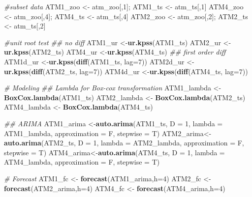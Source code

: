 \documentclass[openany]{book}
\newenvironment{Shaded}{\begin{snugshade}}{\end{snugshade}}
\newcommand{\CommentTok}[1]{\textcolor[rgb]{0.56,0.35,0.01}{\textit{#1}}}
\newcommand{\DataTypeTok}[1]{\textcolor[rgb]{0.13,0.29,0.53}{#1}}
\newcommand{\DecValTok}[1]{\textcolor[rgb]{0.00,0.00,0.81}{#1}}
\newcommand{\KeywordTok}[1]{\textcolor[rgb]{0.13,0.29,0.53}{\textbf{#1}}}
\newcommand{\NormalTok}[1]{#1}
\newcommand{\StringTok}[1]{\textcolor[rgb]{0.31,0.60,0.02}{#1}}
\begin{document}
\begin{Shaded}
\begin{Highlighting}[]
{{{{{{{{\CommentTok{#subset data }
\NormalTok{ATM1_zoo <-}\StringTok{ }\NormalTok{atm_zoo[,}\DecValTok{1}\NormalTok{]; ATM1_ts <-}\StringTok{ }\NormalTok{atm_ts[,}\DecValTok{1}\NormalTok{]}
\NormalTok{ATM4_zoo <-}\StringTok{ }\NormalTok{atm_zoo[,}\DecValTok{4}\NormalTok{]; ATM4_ts <-}\StringTok{ }\NormalTok{atm_ts[,}\DecValTok{4}\NormalTok{]}
\NormalTok{ATM2_zoo <-}\StringTok{ }\NormalTok{atm_zoo[,}\DecValTok{2}\NormalTok{]; ATM2_ts <-}\StringTok{ }\NormalTok{atm_ts[,}\DecValTok{2}\NormalTok{]}

\CommentTok{#unit root test}
\CommentTok{## no diff}
\NormalTok{ATM1_ur <-}\KeywordTok{ur.kpss}\NormalTok{(ATM1_ts)}
\NormalTok{ATM2_ur <-}\KeywordTok{ur.kpss}\NormalTok{(ATM2_ts)}
\NormalTok{ATM4_ur <-}\KeywordTok{ur.kpss}\NormalTok{(ATM4_ts)}
\CommentTok{## first order diff}
\NormalTok{ATM1d_ur <-}\KeywordTok{ur.kpss}\NormalTok{(}\KeywordTok{diff}\NormalTok{(ATM1_ts, }\DataTypeTok{lag=}\DecValTok{7}\NormalTok{))}
\NormalTok{ATM2d_ur <-}\KeywordTok{ur.kpss}\NormalTok{(}\KeywordTok{diff}\NormalTok{(ATM2_ts, }\DataTypeTok{lag=}\DecValTok{7}\NormalTok{))}
\NormalTok{ATM4d_ur <-}\KeywordTok{ur.kpss}\NormalTok{(}\KeywordTok{diff}\NormalTok{(ATM4_ts, }\DataTypeTok{lag=}\DecValTok{7}\NormalTok{))}

\CommentTok{# Modeling }
\CommentTok{## Lambda for Box-cox transformation}
\NormalTok{ATM1_lambda <-}\StringTok{ }\KeywordTok{BoxCox.lambda}\NormalTok{(ATM1_ts)}
\NormalTok{ATM2_lambda <-}\StringTok{ }\KeywordTok{BoxCox.lambda}\NormalTok{(ATM2_ts)}
\NormalTok{ATM4_lambda <-}\StringTok{ }\KeywordTok{BoxCox.lambda}\NormalTok{(ATM4_ts)}

\CommentTok{## ARIMA}
\NormalTok{ATM1_arima <-}\KeywordTok{auto.arima}\NormalTok{(ATM1_ts, }\DataTypeTok{D =} \DecValTok{1}\NormalTok{, }\DataTypeTok{lambda =}\NormalTok{ ATM1_lambda, }\DataTypeTok{approximation =}\NormalTok{ F, }\DataTypeTok{stepwise =}\NormalTok{ T)}
\NormalTok{ATM2_arima<-}\KeywordTok{auto.arima}\NormalTok{(ATM2_ts, }\DataTypeTok{D =} \DecValTok{1}\NormalTok{, }\DataTypeTok{lambda =}\NormalTok{ ATM2_lambda, }\DataTypeTok{approximation =}\NormalTok{ F, }\DataTypeTok{stepwise =}\NormalTok{ T)}
\NormalTok{ATM4_arima<-}\KeywordTok{auto.arima}\NormalTok{(ATM4_ts, }\DataTypeTok{D =} \DecValTok{1}\NormalTok{, }\DataTypeTok{lambda =}\NormalTok{ ATM4_lambda, }\DataTypeTok{approximation =}\NormalTok{ F, }\DataTypeTok{stepwise =}\NormalTok{ T)}

\CommentTok{# Forecast}
\NormalTok{ATM1_fc <-}\StringTok{ }\KeywordTok{forecast}\NormalTok{(ATM1_arima,}\DataTypeTok{h=}\DecValTok{4}\NormalTok{)}
\NormalTok{ATM2_fc <-}\StringTok{ }\KeywordTok{forecast}\NormalTok{(ATM2_arima,}\DataTypeTok{h=}\DecValTok{4}\NormalTok{)}
\NormalTok{ATM4_fc <-}\StringTok{ }\KeywordTok{forecast}\NormalTok{(ATM4_arima,}\DataTypeTok{h=}\DecValTok{4}\NormalTok{)}

}}}}}}}}
\end{Highlighting}
\end{Shaded}
\end{document}
